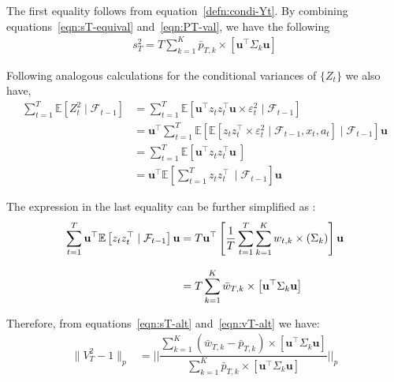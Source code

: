 \documentclass[11pt,letterpaper]{article}
\newcommand{\Exs}{\mathbb{E}}
\newcommand{\z}{z}
\newcommand{\fil}{\mathcal{F}}
\newcommand{\lvec}{\textbf{u}}
\theoremstyle{plain}
\theoremstyle{definition}  %
\begin{document}
\noindent The first equality follows from equation~\eqref{defn:condi-Yt}. By combining equations~\eqref{eqn:sT-equival} and~\eqref{eqn:PT-val}, we have the following
\begin{align}\label{eqn:sT-alt}
   s^2_T = T\sum^K_{k=1} \bar{p}_{T,k} \times \left[  \lvec^{\top} \Sigma_k \lvec \right] 
\end{align}

\noindent Following analogous calculations for the conditional variances of $\{Z_t \}$ we also have,
\begin{align*}
    \sum^T_{t=1} \Exs[Z^2_t \mid \mathcal{F}_{t-1}]
    & = \sum^T_{t=1} \Exs \left[\lvec^{\top} \z_t \z^{\top}_t \lvec \times \varepsilon^2_t \mid \fil_{t-1}\right]\\[8pt]
    & =   \lvec^{\top}  \sum^T_{t=1} \Exs \left[ \Exs \left[ \z_t \z^{\top}_t \times \varepsilon^2_t \mid \mathcal{F}_{t-1},x_t,a_t\right] \mid \fil_{t-1} \right] \lvec \\[8pt]
     & =  \sum^T_{t=1} \Exs \left[\lvec^{\top} \z_t \z^{\top}_t \lvec \ \right]\\[8pt]
     & =   \lvec^{\top} \Exs \left[ \sum^T_{t=1} \z_t \z^{\top}_t  \ \mid \fil_{t-1} \right]\lvec
\end{align*}

\noindent The expression in the last equality can be further simplified as :
\begin{align}\label{eqn:vT-alt}
\notag
   \sum^T_{t=1}  \lvec^{\top} \Exs \left[\z_t \z^{\top}_t \mid \mathcal{F}_{t-1} \right] \lvec 
     & = T \lvec^{\top} \left[\frac{1}{T} \sum^T_{t=1} \sum^K_{k=1} w_{t,k} \times (\Sigma_k) \right]\lvec \\[8pt]
    & = T\sum^K_{k=1} \bar{w}_{T,k} \times \left[   \lvec^{\top} \Sigma_k \lvec \right] 
\end{align}

\noindent Therefore, from equations~\eqref{eqn:sT-alt} and~\eqref{eqn:vT-alt} we have:
\begin{align}\label{eqn:VT-alt}
    \|V^2_T-1 \|_p
    & = \bigg| \bigg| \dfrac{\sum^K_{k=1} (\bar{w}_{T,k}-\bar{p}_{T,k}) \times \left[  \lvec^{\top} \Sigma_k \lvec \right] }{\sum^K_{k=1} \bar{p}_{T,k} \times \left[ \lvec^{\top} \Sigma_k \lvec \right] } \bigg| \bigg|_p
\end{align}
\vspace{1pt}
\end{document}
